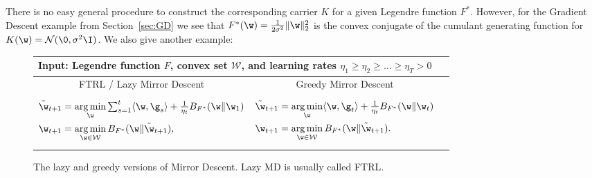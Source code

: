 \documentclass{colt2018} %
\DeclareMathOperator*{\argmin}{arg\,min}
\newcommand{\domainw}{\mathcal{W}}
\newcommand{\normal}{\mathcal{N}}       %
\newcommand{\inner}[2]{\langle #1, #2 \rangle}  %
\begin{document}
There is no easy general procedure to construct the corresponding
carrier $K$ for a given Legendre function $F^*$. However, for the Gradient Descent
example from Section~\ref{sec:GD} we see that $F^*(\w) = \frac{1}{2\sigma^2} \|\w\|_2^2$ is the convex conjugate of the cumulant generating
function for $K(\w) = \normal(\0,\sigma^2 \I)$. We also give another example:
% 
% 
% 
% 
% 
% 
% 
\begin{figure}
{%
\centering \small
\begin{tabular}{| c | c | r |}
\hline
\multicolumn{2}{|l|}{\textbf{Input:} Legendre function $F$, convex set $\domainw$, and learning rates $\eta_1 \geq  \eta_{2} \geq \ldots \geq
  \eta_T > 0$} \\
\hline
FTRL / Lazy Mirror Descent & Greedy Mirror Descent \\
\hline
\parbox{7.2cm}{ \vspace{-0.35cm} \begin{equation*}
\begin{split}
  \tilde{\w}_{t+1} & = \argmin_\w \textstyle\sum_{s=1}^t \inner{\w}{\g_s} + \frac{1}{\eta_t} B_{F^*}(\w\|\w_1) \\
\w_{t+1} & = \argmin_{\w \in \domainw}B_{F^*}(\w\|\tilde{\w}_{t+1}),
\end{split}
\end{equation*} \vspace{-0.35cm} } & \parbox{6.8cm}{ \vspace{-0.35cm} \begin{equation*}
\begin{split}
  \tilde{\w}_{t+1} & = \argmin_\w \inner{\w}{\g_t} + \tfrac{1}{\eta_t} B_{F^*}(\w\|\w_t) \\
\w_{t+1} & = \argmin_{\w \in \domainw}B_{F^*}(\w\|\tilde{\w}_{t+1}).
\end{split}
\end{equation*} \vspace{-0.35cm} } \\
\hline
\end{tabular}
% 
% 
% 
% 
% 
% 
% 
% 
% 
% 
% 
% 
% 
% 
% 
% 
% 
% 
% 
}
\caption{The lazy and greedy versions of Mirror Descent. Lazy MD is
usually called FTRL.}\label{alg:MD}
\end{figure}
\end{document}
